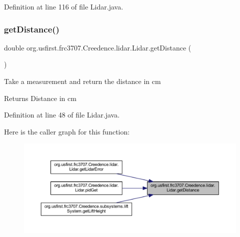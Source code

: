 Definition at line 116 of file Lidar.\+java.

\mbox{\label{classorg_1_1usfirst_1_1frc3707_1_1_creedence_1_1lidar_1_1_lidar_a5d9a5bb9840870d49790080625fac6f8}} 
\subsubsection{\texorpdfstring{getDistance()}{getDistance()}}
{\footnotesize\ttfamily double org.\+usfirst.\+frc3707.\+Creedence.\+lidar.\+Lidar.\+get\+Distance (\begin{DoxyParamCaption}{ }\end{DoxyParamCaption})}

Take a measurement and return the distance in cm

\begin{DoxyReturn}{Returns}
Distance in cm 
\end{DoxyReturn}


Definition at line 48 of file Lidar.\+java.

Here is the caller graph for this function\+:
\nopagebreak
\begin{figure}[H]
\begin{center}
\leavevmode
\includegraphics[width=350pt]{classorg_1_1usfirst_1_1frc3707_1_1_creedence_1_1lidar_1_1_lidar_a5d9a5bb9840870d49790080625fac6f8_icgraph}
\end{center}
\end{figure}
\mbox{\label{classorg_1_1usfirst_1_1frc3707_1_1_creedence_1_1lidar_1_1_lidar_a4b43b720ccd9dc55a606ba0c91b3e894}} 
